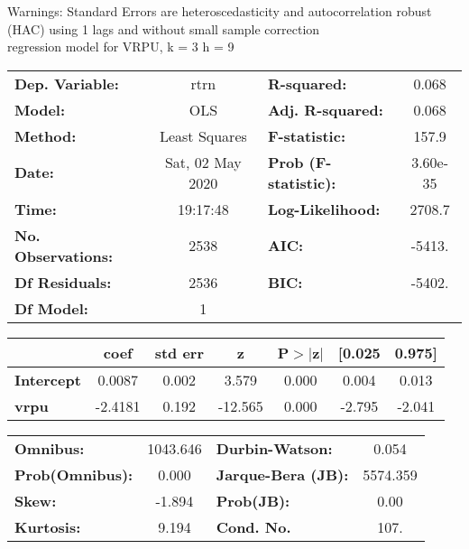 Warnings: \newline
 [1] Standard Errors are heteroscedasticity and autocorrelation robust (HAC) using 1 lags and without small sample correction\\ 

regression model for VRPU, k = 3 h = 9\begin{center}
\begin{tabular}{lclc}
\toprule
\textbf{Dep. Variable:}    &       rtrn       & \textbf{  R-squared:         } &     0.068   \\
\textbf{Model:}            &       OLS        & \textbf{  Adj. R-squared:    } &     0.068   \\
\textbf{Method:}           &  Least Squares   & \textbf{  F-statistic:       } &     157.9   \\
\textbf{Date:}             & Sat, 02 May 2020 & \textbf{  Prob (F-statistic):} &  3.60e-35   \\
\textbf{Time:}             &     19:17:48     & \textbf{  Log-Likelihood:    } &    2708.7   \\
\textbf{No. Observations:} &        2538      & \textbf{  AIC:               } &    -5413.   \\
\textbf{Df Residuals:}     &        2536      & \textbf{  BIC:               } &    -5402.   \\
\textbf{Df Model:}         &           1      & \textbf{                     } &             \\
\bottomrule
\end{tabular}
\begin{tabular}{lcccccc}
                   & \textbf{coef} & \textbf{std err} & \textbf{z} & \textbf{P$> |$z$|$} & \textbf{[0.025} & \textbf{0.975]}  \\
\midrule
\textbf{Intercept} &       0.0087  &        0.002     &     3.579  &         0.000        &        0.004    &        0.013     \\
\textbf{vrpu}      &      -2.4181  &        0.192     &   -12.565  &         0.000        &       -2.795    &       -2.041     \\
\bottomrule
\end{tabular}
\begin{tabular}{lclc}
\textbf{Omnibus:}       & 1043.646 & \textbf{  Durbin-Watson:     } &    0.054  \\
\textbf{Prob(Omnibus):} &   0.000  & \textbf{  Jarque-Bera (JB):  } & 5574.359  \\
\textbf{Skew:}          &  -1.894  & \textbf{  Prob(JB):          } &     0.00  \\
\textbf{Kurtosis:}      &   9.194  & \textbf{  Cond. No.          } &     107.  \\
\bottomrule
\end{tabular}
\end{center}

